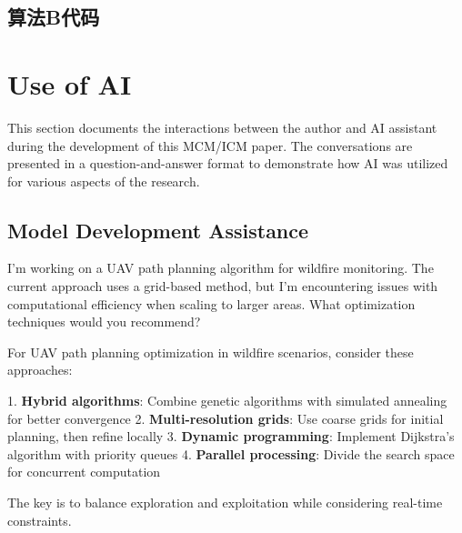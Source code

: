 

\subsection{算法B代码}




\section{Use of AI}

This section documents the interactions between the author and AI assistant during the development of this MCM/ICM paper. The conversations are presented in a question-and-answer format to demonstrate how AI was utilized for various aspects of the research.

\subsection{Model Development Assistance}

\begin{tcolorbox}[title=\textbf{Question: How to optimize the UAV path planning algorithm?}, colback=blue!2!white, colframe=blue!30!black, fonttitle=\bfseries, breakable]
I'm working on a UAV path planning algorithm for wildfire monitoring. The current approach uses a grid-based method, but I'm encountering issues with computational efficiency when scaling to larger areas. What optimization techniques would you recommend?
\end{tcolorbox}

\begin{tcolorbox}[title=\textbf{AI Response}, colback=green!2!white, colframe=green!30!black, fonttitle=\bfseries, breakable]
For UAV path planning optimization in wildfire scenarios, consider these approaches:

1. \textbf{Hybrid algorithms}: Combine genetic algorithms with simulated annealing for better convergence
2. \textbf{Multi-resolution grids}: Use coarse grids for initial planning, then refine locally
3. \textbf{Dynamic programming}: Implement Dijkstra's algorithm with priority queues
4. \textbf{Parallel processing}: Divide the search space for concurrent computation

The key is to balance exploration and exploitation while considering real-time constraints.
\end{tcolorbox}

